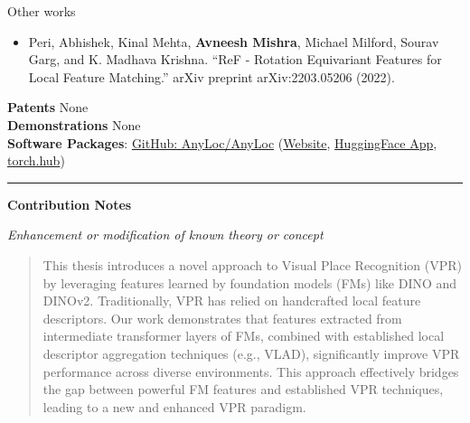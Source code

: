 \documentclass[11pt]{article}
\begin{document}
    Other works
    \begin{itemize}
        \item Peri, Abhishek, Kinal Mehta, \textbf{Avneesh Mishra},
            Michael Milford, Sourav Garg, and K. Madhava Krishna.
            ``ReF - Rotation Equivariant Features for Local Feature
            Matching.'' arXiv preprint arXiv:2203.05206 (2022).
    \end{itemize}
    {\bf \large Patents} None \\ [2mm]
    {\bf \large Demonstrations} None \\ [2mm]
    {\bf \large Software Packages}:
    \href{https://github.com/AnyLoc/AnyLoc}{GitHub: AnyLoc/AnyLoc} 
    (\href{https://anyloc.github.io/}{Website}, 
    \href{https://huggingface.co/spaces/TheProjectsGuy/AnyLoc}{
        HuggingFace App},
    \href{https://github.com/AnyLoc/DINO}{torch.hub})
    \vspace{2mm}
    \hrule
    \vspace{3mm}
    {\bf \large Contribution Notes} \\ [2mm]
    \begin{minipage}{\textwidth}
    {\it Enhancement or modification of known theory or concept}
    \vspace{-2mm}
    \begin{quotation}
        \noindent
        This thesis introduces a novel approach to Visual Place
        Recognition (VPR) by leveraging features learned by foundation
        models (FMs) like DINO and DINOv2. Traditionally, VPR has
        relied on handcrafted local feature descriptors. Our work
        demonstrates that features extracted from intermediate
        transformer layers of FMs, combined with established local
        descriptor aggregation techniques (e.g., VLAD), significantly
        improve VPR performance across diverse environments. This
        approach effectively bridges the gap between powerful FM
        features and established VPR techniques, leading to a new and
        enhanced VPR paradigm.
    \end{quotation}
    \end{minipage}
    \vspace{2mm}
\end{document}
